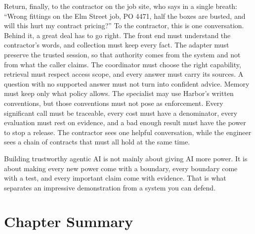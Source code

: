 Return, finally, to the contractor on the job site, who says in a single breath: ``Wrong fittings on the Elm Street job, PO 4471, half the boxes are busted, and will this hurt my contract pricing?'' To the contractor, this is one conversation. Behind it, a great deal has to go right. The front end must understand the contractor's words, and collection must keep every fact. The adapter must preserve the trusted session, so that authority comes from the system and not from what the caller claims. The coordinator must choose the right capability, retrieval must respect access scope, and every answer must carry its sources. A question with no supported answer must not turn into confident advice. Memory must keep only what policy allows. The specialist may use Harbor's written conventions, but those conventions must not pose as enforcement. Every significant call must be traceable, every cost must have a denominator, every evaluation must rest on evidence, and a bad enough result must have the power to stop a release. The contractor sees one helpful conversation, while the engineer sees a chain of contracts that must all hold at the same time.

\begin{principle}
Building trustworthy agentic AI is not mainly about giving AI more power. It is about making every new power come with a boundary, every boundary come with a test, and every important claim come with evidence. That is what separates an impressive demonstration from a system you can defend.
\end{principle}

\section*{Chapter Summary}

